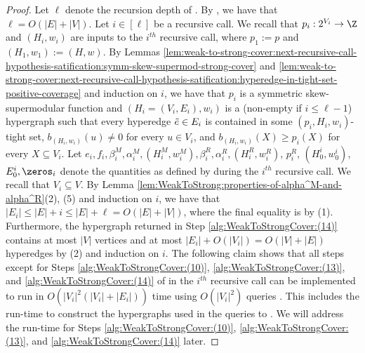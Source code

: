 \begin{proof}
Let $\ell$ denote the recursion depth of . By , we have that $\ell=O(|E|+|V|)$. 
Let  $i \in [\ell]$ be a recursive call.
 We recall that $p_i:2^{V_i}\rightarrow\Z$ and $(H_i, w_i)$ are inputs to the $i^{th}$ recursive call, where $p_1 := p$ and $(H_1, w_1) := (H, w)$.
By Lemmas \ref{lem:weak-to-strong-cover:next-recursive-call-hypothesis-satification:symm-skew-supermod-strong-cover} and \ref{lem:weak-to-strong-cover:next-recursive-call-hypothesis-satification:hyperedge-in-tight-set-positive-coverage} and induction on $i$, we have that $p_i$ is a symmetric skew-supermodular function and $(H_i = (V_i, E_i), w_i)$ is a (non-empty if $i \leq \ell - 1$) hypergraph such that every hyperedge $\Tilde{e} \in E_i$ is contained in some $(p_i, H_i, w_i)$-tight set, $b_{(H_i, w_i)}(u) \not = 0$ for every $u \in V_i$, and $b_{(H_i, w_i)}(X) \geq p_i(X)$ for every $X \subseteq V_i$. Let $e_i, f_i, \beta_i^M, \alpha_i^M, (H_i^M, w_i^M), \beta_i^R, \alpha_i^R, (H_i^R, w_i^R)$, $p_i^R$, $(H_0^{i}, w_0^{i})$, $E_0^i, \zeros_i$ denote the quantities  as defined by  during the $i^{th}$ recursive call. We recall that $V_i \subseteq V$. By Lemma \ref{lem:WeakToStrong:properties-of-alpha^M-and-alpha^R}(2), (5) and induction on $i$, we have that $|E_i| \leq |E| + i \leq |E| + \ell = O(|E| + |V|)$, where the final equality is by (1). 
Furthermore, the hypergraph returned in Step \ref{alg:WeakToStrongCover:(14)} contains at most $|V|$ vertices and at most $|E_i| + O(|V_i|)= O(|V| + |E|)$ hyperedges by (2) and induction on $i$. 
The following claim shows that all steps except for Steps \ref{alg:WeakToStrongCover:(10)},  \ref{alg:WeakToStrongCover:(13)}, and  \ref{alg:WeakToStrongCover:(14)} of  in the $i^{th}$ recursive call can be implemented to run in $O(|V_i|^2(|V_i| + |E_i|))$ time
using $O(|V_i|^2)$ queries . This includes the run-time to construct the hypergraphs used in the queries to . We will address the run-time for Steps \ref{alg:WeakToStrongCover:(10)},  \ref{alg:WeakToStrongCover:(13)}, and  \ref{alg:WeakToStrongCover:(14)} later. 


\end{proof}
